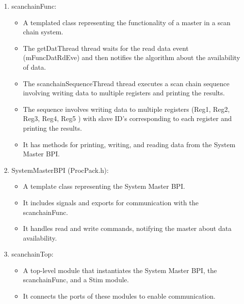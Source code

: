 \documentclass[a4paper,12pt,english]{report}
\begin{document}
\begin{enumerate}
    \item scanchainFunc:

\begin{itemize}
    \item A templated class representing the functionality of a master in a scan chain system.

    \item The getDatThread thread waits for the read data event (mFuncDatRdEve) and then notifies the algorithm about the availability of data.

    \item The scanchainSequenceThread thread executes a scan chain sequence involving writing data to multiple registers and printing the results.

    \item The sequence involves writing data to multiple registers (Reg1, Reg2, Reg3, Reg4, Reg5 ) with slave ID's corresponding to each register and printing the results.

    \item It has methods for printing, writing, and reading data from the System Master BPI.
\end{itemize}

    \item SystemMasterBPI (ProcPack.h):
    
\begin{itemize}
    \item A template class representing the System Master BPI.

    \item It includes signals and exports for communication with the scanchainFunc.

    \item It handles read and write commands, notifying the master about data availability.
\end{itemize}

    \item scanchainTop:

\begin{itemize}
    \item A top-level module that instantiates the System Master BPI, the scanchainFunc, and a Stim module.

    \item It connects the ports of these modules to enable communication.
\end{itemize}


\end{enumerate}
\end{document}
